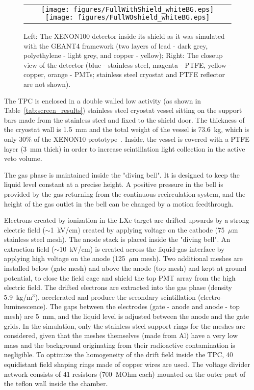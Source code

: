 \begin{figure}[!h]
\begin{center}
\begin{tabular}{c}
 \texttt{[image: figures/FullWithShield\_whiteBG.eps]}
\texttt{[image: figures/FullWOshield\_whiteBG.eps]}
\end{tabular}
\caption{Left: The XENON100 detector inside its shield as it was simulated with the
GEANT4 framework (two layers of lead - dark grey, polyethylene - light grey, and copper - yellow); 
Right: The closeup view of the detector (blue - stainless steel, magenta - PTFE, yellow - copper, 
orange - PMTs; stainless steel cryostat and PTFE reflector are not
shown).}
\label{DetectorModel}
\end{center}
\end{figure}

The TPC is enclosed in a double walled low activity (as shown in 
Table~\ref{tab:screen_results}) stainless steel cryostat vessel sitting on the support bars made from the stainless steel and fixed to the shield door. The thickness of the cryostat wall is 1.5~mm 
and the total weight of the vessel is 73.6~kg, which is only 30\% of the XENON10 
prototype~\cite{xe10}. Inside, the vessel is covered with a PTFE layer (3~mm thick) in order to 
increase scintillation light collection in the active veto volume. 

The gas phase is maintained inside the "diving bell". It is designed to keep the liquid level constant at a precise height. A positive pressure in the bell is provided by the gas returning from the continuous recirculation system, and the height of the gas outlet in the bell can be changed by a motion feedthrough.

Electrons created by ionization in the LXe target are drifted upwards by a strong electric 
field ($\sim$1~kV/cm) created by applying voltage on the cathode (75~$\mu$m stainless steel mesh). The anode stack is placed inside the "diving bell". An extraction field ($\sim$10~kV/cm) is created across the liquid-gas interface 
by applying high voltage on the anode (125~$\mu$m mesh). Two additional meshes are installed below (gate mesh) and above the anode (top mesh) and kept at ground potential, to close the field cage and shield the top PMT array from the high electric field. The drifted electrons are extracted into the gas phase 
(density 5.9~kg/m$^3$), accelerated and produce the secondary scintillation (electro-luminescence). 
The gaps between the electrodes (gate - anode and anode - top mesh) are 5~mm, and the liquid level is adjusted between the anode and the gate grids. 
In the simulation, only the stainless steel support rings for the meshes are considered, given that the meshes themselves (made from Al) have a very low mass and the background originating from their radioactive contamination is negligible.
To optimize the homogeneity of the drift field inside the TPC, 40 equidistant field shaping rings made of copper wires are used. The voltage divider network consists of 41 resistors (700~MOhm each) mounted on the outer part of the teflon wall inside the chamber.

